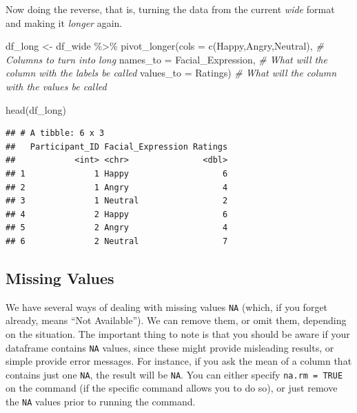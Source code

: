 \documentclass[
]{book}
\newenvironment{Shaded}{\begin{snugshade}}{\end{snugshade}}
\newcommand{\AttributeTok}[1]{\textcolor[rgb]{0.77,0.63,0.00}{#1}}
\newcommand{\CommentTok}[1]{\textcolor[rgb]{0.56,0.35,0.01}{\textit{#1}}}
\newcommand{\FunctionTok}[1]{\textcolor[rgb]{0.00,0.00,0.00}{#1}}
\newcommand{\NormalTok}[1]{#1}
\newcommand{\OtherTok}[1]{\textcolor[rgb]{0.56,0.35,0.01}{#1}}
\newcommand{\SpecialCharTok}[1]{\textcolor[rgb]{0.00,0.00,0.00}{#1}}
\newcommand{\StringTok}[1]{\textcolor[rgb]{0.31,0.60,0.02}{#1}}
\begin{document}
Now doing the reverse, that is, turning the data from the current \emph{wide} format and making it \emph{longer} again.

\begin{Shaded}
\begin{Highlighting}[]
\NormalTok{df\_long }\OtherTok{\textless{}{-}}\NormalTok{ df\_wide }\SpecialCharTok{\%\textgreater{}\%} 
  \FunctionTok{pivot\_longer}\NormalTok{(}\AttributeTok{cols =} \FunctionTok{c}\NormalTok{(}\StringTok{\textquotesingle{}Happy\textquotesingle{}}\NormalTok{,}\StringTok{\textquotesingle{}Angry\textquotesingle{}}\NormalTok{,}\StringTok{\textquotesingle{}Neutral\textquotesingle{}}\NormalTok{),  }\CommentTok{\# Columns to turn into long}
               \AttributeTok{names\_to =} \StringTok{\textquotesingle{}Facial\_Expression\textquotesingle{}}\NormalTok{,  }\CommentTok{\# What will the column with the labels be called}
               \AttributeTok{values\_to =} \StringTok{\textquotesingle{}Ratings\textquotesingle{}}\NormalTok{)  }\CommentTok{\# What will the column with the values be called}

\FunctionTok{head}\NormalTok{(df\_long)}
\end{Highlighting}
\end{Shaded}

\begin{verbatim}
## # A tibble: 6 x 3
##   Participant_ID Facial_Expression Ratings
##            <int> <chr>               <dbl>
## 1              1 Happy                   6
## 2              1 Angry                   4
## 3              1 Neutral                 2
## 4              2 Happy                   6
## 5              2 Angry                   4
## 6              2 Neutral                 7
\end{verbatim}

\hypertarget{missing-values}{%
\subsection{Missing Values}\label{missing-values}}

We have several ways of dealing with missing values \texttt{NA} (which, if you forget already, means ``Not Available'').
We can remove them, or omit them, depending on the situation.
The important thing to note is that you should be aware if your dataframe contains \texttt{NA} values, since these might provide misleading results, or simple provide error messages.
For instance, if you ask the mean of a column that contains just one \texttt{NA}, the result will be \texttt{NA}.
You can either specify \texttt{na.rm\ =\ TRUE} on the command (if the specific command allows you to do so), or just remove the \texttt{NA} values prior to running the command.
\end{document}
